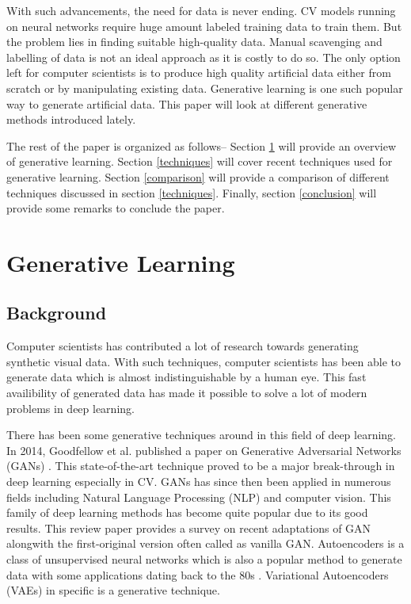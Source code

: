 \documentclass[conference]{IEEEtran}
\begin{document}
With such advancements, the need for data is never ending. CV models running on neural networks require huge amount labeled training data to train them. But the problem lies in finding suitable high-quality data. Manual scavenging and labelling of data is not an ideal approach as it is costly to do so. The only option left for computer scientists is to produce high quality artificial data either from scratch or by manipulating existing data. Generative learning is one such popular way to generate artificial data. This paper will look at different generative methods introduced lately.

The rest of the paper is organized as follows-- Section \ref{lr} will provide an overview of generative learning. Section \ref{techniques} will cover recent techniques used for generative learning. Section \ref{comparison} will provide a comparison of different techniques discussed in section \ref{techniques}. Finally, section \ref{conclusion} will provide some remarks to conclude the paper. 

\section{Generative Learning}
\label{lr}
\subsection{Background}
Computer scientists has contributed a lot of research towards generating synthetic visual data. With such techniques, computer scientists has been able to generate data which is almost indistinguishable by a human eye. This fast availibility of generated data has made it possible to solve a lot of modern problems in deep learning.

There has been some generative techniques around in this field of deep learning. In 2014, Goodfellow et al. published a paper on Generative Adversarial Networks (GANs) \cite{b1}. This state-of-the-art technique proved to be a major break-through in deep learning especially in CV. GANs has since then been applied in numerous fields including Natural Language Processing (NLP) and computer vision. This family of deep learning methods has become quite popular due to its good results. This review paper provides a survey on recent adaptations of GAN alongwith the first-original version often called as vanilla GAN. Autoencoders is a class of unsupervised neural networks which is also a popular method to generate data with some applications dating back to the 80s \cite{b2, b3}. Variational Autoencoders (VAEs) in specific is a generative technique.
\end{document}
